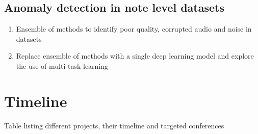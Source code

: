 \documentclass[journal,onecolumn]{IEEEtran}
\begin{document}
\subsection{Anomaly detection in note level datasets}
\begin{enumerate}
\item Ensemble of methods to identify poor quality, corrupted audio and noise in datasets
\item Replace ensemble of methods with a single deep learning model and explore the use of multi-task learning
\end{enumerate}
\section{Timeline}

Table listing different projects, their timeline and targeted conferences 




%
%

\end{document}
